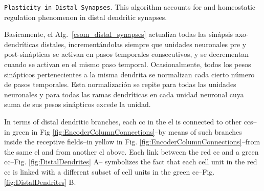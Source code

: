 {\begin{algorithm}
	\caption{\texttt{Plasticity in Distal Synapses}. This algorithm accounts for  and homeostatic regulation phenomenon in distal dendritic synapses.}
\label{csom_distal_synapses}
\begin{algorithmic}[1]
		\ENDFOR
	\ENDFOR
		\ENDFOR
	\ENDFOR
				\ENDIF
			\ENDFOR
		\ENDFOR
	\ENDIF
\end{algorithmic}
\end{algorithm}

Basicamente, el Alg.~\ref{csom_distal_synapses} actualiza todas las sinápsis axo-dendríticas distales, incrementándolas siempre que unidades neuronales pre y post-sinápticas se activan en pasos temporales consecutivos, y se decrementan cuando se activan en el mismo paso temporal. Ocasionalmente, todos los pesos sinápticos pertenecientes a la misma dendrita se normalizan cada cierto número de pasos temporales. Esta normalización se repite para todas las unidades neuronales y para todas las ramas dendríticas en cada unidad neuronal cuya suma de sus pesos sinápticos excede la unidad.
}{
In terms of distal dendritic branches, each \gls{cc} in the \gls{el} is connected to other \glspl{cc}--in green in Fig \ref{fig:EncoderColumnConnections}--by means of such
branches inside the receptive fields--in yellow in Fig. \ref{fig:EncoderColumnConnections}--from the same \gls{el} and from another \gls{cl}
above.
Each link between the red \gls{cc} and a green \gls{cc}--Fig. \ref{fig:DistalDendrites} A--
symbolizes the fact that each cell unit in
the red \gls{cc} is linked with a different subset of cell units in the green \gls{cc}--Fig. \ref{fig:DistalDendrites} B.

}
